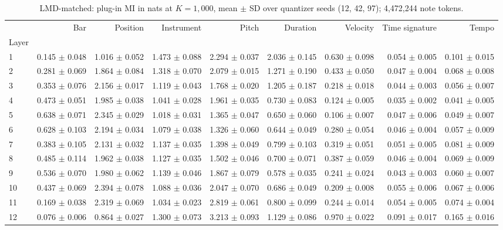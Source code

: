 \documentclass[10pt]{article}
\begin{document}
\begin{table}[h]\centering\scriptsize\setlength{\tabcolsep}{3.5pt}
\caption{LMD-matched: plug-in MI in nats at $K=1,000$, mean $\pm$ SD over quantizer seeds (12, 42, 97); 4,472,244 note tokens.}\label{tab:lmd1000}
\begin{tabular}{lrrrrrrrr}
\toprule
 & Bar & Position & Instrument & Pitch & Duration & Velocity & Time signature & Tempo \\
Layer &  &  &  &  &  &  &  &  \\
\midrule
1 & 0.145 $\pm$ 0.048 & 1.016 $\pm$ 0.052 & 1.473 $\pm$ 0.088 & 2.294 $\pm$ 0.037 & 2.036 $\pm$ 0.145 & 0.630 $\pm$ 0.098 & 0.054 $\pm$ 0.005 & 0.101 $\pm$ 0.015 \\
2 & 0.281 $\pm$ 0.069 & 1.864 $\pm$ 0.084 & 1.318 $\pm$ 0.070 & 2.079 $\pm$ 0.015 & 1.271 $\pm$ 0.190 & 0.433 $\pm$ 0.050 & 0.047 $\pm$ 0.004 & 0.068 $\pm$ 0.008 \\
3 & 0.353 $\pm$ 0.076 & 2.156 $\pm$ 0.017 & 1.119 $\pm$ 0.043 & 1.768 $\pm$ 0.020 & 1.205 $\pm$ 0.187 & 0.218 $\pm$ 0.018 & 0.044 $\pm$ 0.003 & 0.056 $\pm$ 0.007 \\
4 & 0.473 $\pm$ 0.051 & 1.985 $\pm$ 0.038 & 1.041 $\pm$ 0.028 & 1.961 $\pm$ 0.035 & 0.730 $\pm$ 0.083 & 0.124 $\pm$ 0.005 & 0.035 $\pm$ 0.002 & 0.041 $\pm$ 0.005 \\
5 & 0.638 $\pm$ 0.071 & 2.345 $\pm$ 0.029 & 1.018 $\pm$ 0.031 & 1.365 $\pm$ 0.047 & 0.650 $\pm$ 0.060 & 0.106 $\pm$ 0.007 & 0.047 $\pm$ 0.006 & 0.049 $\pm$ 0.007 \\
6 & 0.628 $\pm$ 0.103 & 2.194 $\pm$ 0.034 & 1.079 $\pm$ 0.038 & 1.326 $\pm$ 0.060 & 0.644 $\pm$ 0.049 & 0.280 $\pm$ 0.054 & 0.046 $\pm$ 0.004 & 0.057 $\pm$ 0.009 \\
7 & 0.383 $\pm$ 0.105 & 2.131 $\pm$ 0.032 & 1.137 $\pm$ 0.035 & 1.398 $\pm$ 0.049 & 0.799 $\pm$ 0.103 & 0.319 $\pm$ 0.051 & 0.051 $\pm$ 0.005 & 0.081 $\pm$ 0.009 \\
8 & 0.485 $\pm$ 0.114 & 1.962 $\pm$ 0.038 & 1.127 $\pm$ 0.035 & 1.502 $\pm$ 0.046 & 0.700 $\pm$ 0.071 & 0.387 $\pm$ 0.059 & 0.046 $\pm$ 0.004 & 0.069 $\pm$ 0.009 \\
9 & 0.536 $\pm$ 0.070 & 1.980 $\pm$ 0.062 & 1.139 $\pm$ 0.046 & 1.867 $\pm$ 0.079 & 0.578 $\pm$ 0.035 & 0.241 $\pm$ 0.024 & 0.043 $\pm$ 0.003 & 0.060 $\pm$ 0.007 \\
10 & 0.437 $\pm$ 0.069 & 2.394 $\pm$ 0.078 & 1.088 $\pm$ 0.036 & 2.047 $\pm$ 0.070 & 0.686 $\pm$ 0.049 & 0.209 $\pm$ 0.008 & 0.055 $\pm$ 0.006 & 0.067 $\pm$ 0.006 \\
11 & 0.169 $\pm$ 0.038 & 2.319 $\pm$ 0.069 & 1.034 $\pm$ 0.023 & 2.819 $\pm$ 0.061 & 0.800 $\pm$ 0.099 & 0.244 $\pm$ 0.014 & 0.054 $\pm$ 0.005 & 0.074 $\pm$ 0.004 \\
12 & 0.076 $\pm$ 0.006 & 0.864 $\pm$ 0.027 & 1.300 $\pm$ 0.073 & 3.213 $\pm$ 0.093 & 1.129 $\pm$ 0.086 & 0.970 $\pm$ 0.022 & 0.091 $\pm$ 0.017 & 0.165 $\pm$ 0.016 \\
\bottomrule
\end{tabular}
\end{table}
\end{document}

